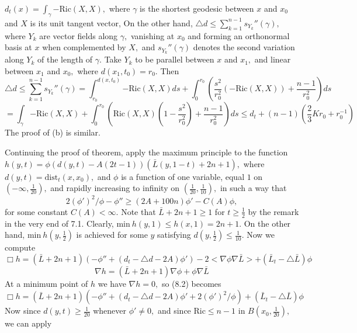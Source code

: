 \documentclass[12pt]{article}
\theoremstyle{plain}
{\swapnumbers
\newtheorem{thm}{Theorem}[section]
\newtheorem{cor}[thm]{Corollary}
\newtheorem{lem}[thm]{Lemma}
\newtheorem{prop}[thm]{Proposition}
}
\theoremstyle{definition}
{\swapnumbers
\newtheorem{defn}[thm]{Definition}
\newtheorem{nota}[thm]{Notation}
\newtheorem{parag}[thm]{}
\newtheorem*{parstr}{\addtocounter{thm}{1}\thesection.\arabic{thm}*}
\newtheorem*{intropar}{\addtocounter{thm}{1}\arabic{thm}}
}
\theoremstyle{remark} {\swapnumbers
\newtheorem{rem}[thm]{Remark}
\newtheorem{exam}[thm]{Example}
\newtheorem{lemma}[thm]{Lemma}
\newtheorem{claim}[thm]{Claim}
}
\numberwithin{equation}{section}
\begin{document}
 $d_t(x)=\int_{\gamma}{-\mbox{Ric}(X,X)},$ where $\gamma$ is the
 shortest geodesic between $x$ and $x_0$ and $X$ is its unit
 tangent vector, On the other hand, $\triangle d\le
 \sum_{k=1}^{n-1}{s_{Y_k}''(\gamma)},$ where $Y_k$ are vector
 fields along $\gamma,$ vanishing at $x_0$ and forming an
 orthonormal basis at $x$ when complemented by $X,$ and
 $s_{Y_k}''(\gamma)$ denotes the second variation  along $Y_k$
 of the length of $\gamma.$ Take $Y_k$ to be parallel between $x$
 and $x_1,$ and linear between $x_1$ and $x_0,$ where
 $d(x_1,t_0)=r_0.$ Then $$ \triangle
 d\le\sum_{k=1}^{n-1}s_{Y_k}''(\gamma)=\int_{r_0}^{d(x,t_0)}{-\mbox{Ric}(X,X)ds}+\int_0^{r_0}
 {(\frac{s^2}{r_0^2}(-\mbox{Ric}(X,X))+\frac{n-1}{r_0^2})ds} $$
 $$=\int_{\gamma}{-\mbox{Ric}(X,X)}
 +\int_0^{r_0}{(\mbox{Ric}(X,X)(1-\frac{s^2}{r_0^2})+\frac{n-1}{r_0^2})ds}\le
 d_t+(n-1)(\frac{2}{3}Kr_0+r_0^{-1})$$ The proof of (b) is similar. \par Continuing the proof
 of theorem, apply the maximum principle to the function  $
 h(y,t)=\phi(d(y,t)-A(2t-1))(\bar{L}(y,1-t)+2n+1),$ where
 $d(y,t)=\mbox{dist}_t(x,x_0),$ and $\phi$ is a function of one
 variable, equal $1$ on $(-\infty,\frac{1}{20}),$ and rapidly
 increasing to infinity on $(\frac{1}{20},\frac{1}{10}),$ in such
 a way that \begin{equation} 2(\phi ')^2/\phi-\phi ''\ge (2A+100n)\phi
 '-C(A)\phi,\end{equation} for some constant $C(A)<\infty.$ Note that
 $\bar{L}+2n+1\ge 1$ for $t\ge\frac{1}{2}$  by the remark in the
 very end of 7.1. Clearly, $\mbox{min}\  h(y,1)\le h(x,1)=2n+1.$ On
 the other hand, $\mbox{min}\  h(y,\frac{1}{2}) $ is achieved for
 some $y$ satisfying $d(y,\frac{1}{2})\le \frac{1}{10}.$ Now we
 compute \begin{equation} \Box h=(\bar{L}+2n+1)(-\phi
 ''+(d_t-\triangle d-2A)\phi
 ')-2<\nabla\phi\nabla\bar{L}>+(\bar{L}_t-\triangle\bar{L})\phi
 \end{equation}
 \begin{equation} \nabla h=(\bar{L}+2n+1)\nabla\phi+\phi\nabla\bar{L}\end{equation} At
 a minimum point of $h$ we have $\nabla h=0,$ so (8.2) becomes
 \begin{equation} \Box h=(\bar{L}+2n+1)(-\phi ''+(d_t-\triangle d-2A)\phi
 '+2(\phi ')^2/\phi)+(\bar{L}_t-\triangle\bar{L})\phi \end{equation} Now since
 $d(y,t)\ge\frac{1}{20}$ whenever $\phi '\neq 0,$ and
 since $\mbox{Ric}\le n-1$ in $B(x_0,\frac{1}{20}),$ we can apply
\end{document}
